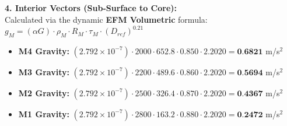 \documentclass[11pt, a4paper]{article}
\begin{document}
  \vspace{0.5em}
  \noindent \textbf{4. Interior Vectors (Sub-Surface to Core):} \\[0.5em]
  \hspace*{1em} Calculated via the dynamic \textbf{EFM Volumetric} formula: $g_M = (\alpha G) \cdot \rho_{M} \cdot R_M \cdot \tau_M \cdot (D_{ref})^{0.21}$
  \begin{itemize}
    \item \textbf{M4 Gravity:} $(2.792 \times 10^{-7}) \cdot 2000 \cdot 652.8 \cdot 0.850 \cdot 2.2020 = \textbf{0.6821}$ m/s$^2$
    \item \textbf{M3 Gravity:} $(2.792 \times 10^{-7}) \cdot 2200 \cdot 489.6 \cdot 0.860 \cdot 2.2020 = \textbf{0.5694}$ m/s$^2$
    \item \textbf{M2 Gravity:} $(2.792 \times 10^{-7}) \cdot 2500 \cdot 326.4 \cdot 0.870 \cdot 2.2020 = \textbf{0.4367}$ m/s$^2$
    \item \textbf{M1 Gravity:} $(2.792 \times 10^{-7}) \cdot 2800 \cdot 163.2 \cdot 0.880 \cdot 2.2020 = \textbf{0.2472}$ m/s$^2$
  \end{itemize}
\end{document}
